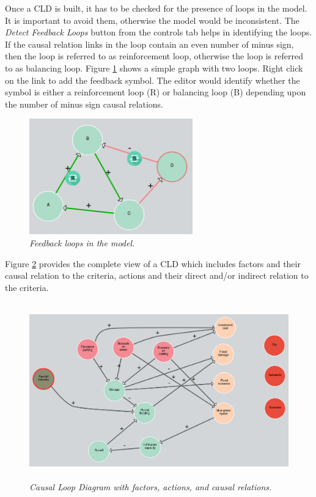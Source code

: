 \documentclass[a4paper]{article}
\begin{document}
Once a CLD is built, it has to be checked for the presence of loops in the model. It is important to avoid them, otherwise the model would be inconsistent. The \textit{Detect Feedback Loops} button from the controls tab helps in identifying the loops. If the causal relation links in the loop contain an even number of minus sign, then the loop is referred to as reinforcement loop, otherwise the loop is referred to as balancing loop. Figure \ref{fig:loops} shows a simple graph with two loops. Right click on the link to add the feedback symbol. The editor would identify whether the symbol is either a reinforcement loop (R) or balancing loop (B) depending upon the number of minus sign causal relations.

\begin{figure}[H]
\begin{center}
\includegraphics[width=0.75\linewidth, height=5cm]{img/loops.png}
\caption{\small \sl Feedback loops in the model.\label{fig:loops}}
\end{center}
\end{figure}

Figure \ref{fig:cld} provides the complete view of a CLD which includes factors and their causal relation to the criteria, actions and their direct and/or indirect relation to the criteria.

\begin{figure}[H]
\begin{center}
\includegraphics[height=3in,width=5in]{img/cld.png}
\caption{\small \sl Causal Loop Diagram with factors, actions, and causal relations.\label{fig:cld}}
\end{center}
\end{figure}
\end{document}
